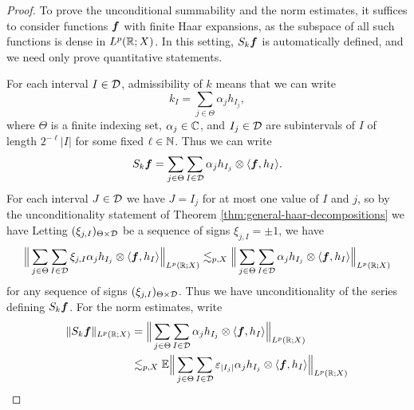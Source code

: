 \begin{proof}
  To prove the unconditional summability and the norm estimates, it suffices to consider functions $\bm{f}$ with finite Haar expansions, as the subspace of all such functions is dense in $L^p(\mathbb{R};X)$.
  In this setting, $S_{k}\bm{f}$ is automatically defined, and we need only prove quantitative statements.
  
  For each interval $I \in \mathcal{D}$, admissibility of $k$ means that we can write
  \begin{equation*}
    k_{I} = \sum_{j \in \Theta} \alpha_{j} h_{I_{j}},
  \end{equation*}
  where $\Theta$ is a finite indexing set, $\alpha_{j} \in \mathbb{C}$, and $I_{j} \in \mathcal{D}$ are subintervals of $I$ of length $2^{-\ell}|I|$ for some fixed $\ell \in \mathbb{N}$.
  Thus we can write
  \begin{equation*}
    \begin{aligned}
      S_{k}\bm{f} = \sum_{j \in \Theta} \sum_{I \in \mathcal{D}} \alpha_{j} h_{I_{j}} \otimes \langle \bm{f}, h_{I} \rangle .
    \end{aligned}
  \end{equation*}
  For each interval $J \in \mathcal{D}$ we have $J = I_{j}$ for at most one value of $I$ and $j$, so by the unconditionality statement of Theorem \ref{thm:general-haar-decompositions} we have
  Letting $(\xi_{j,I})_{\Theta \times \mathcal{D}}$ be a sequence of signs $\xi_{j,I} = \pm 1$, we have
  \begin{equation*}
      \Big\| \sum_{j \in \Theta} \sum_{I \in \mathcal{D}} \xi_{j,I} \alpha_{j} h_{I_{j}} \otimes \langle \bm{f}, h_{I} \rangle \Big\|_{L^p(\mathbb{R};X)}
      \lesssim_{p,X}  \Big\| \sum_{j \in \Theta} \sum_{I \in \mathcal{D}} \alpha_{j} h_{I_{j}} \otimes \langle \bm{f}, h_{I} \rangle \Big\|_{L^p(\mathbb{R};X)}
  \end{equation*}
  for any sequence of signs $(\xi_{j,I})_{\Theta \times \mathcal{D}}$.
  Thus we have unconditionality of the series defining $S_{k}\bm{f}$.
  For the norm estimates, write
  \begin{equation*}
    \begin{aligned}
      \|S_{k} \mb{f}\|_{L^p(\R;X)}
      &= \Big\| \sum_{j \in \Theta} \sum_{I \in \mc{D}} \alpha_{j} h_{I_{j}} \otimes \langle \mb{f}, h_{I} \rangle \Big\|_{L^p(\R;X)} \\
      &\lesssim_{p,X} \E \Big\| \sum_{j \in \Theta} \sum_{I \in \mc{D}} \varepsilon_{|I_{j}|} \alpha_{j} h_{I_{j}} \otimes \langle \mb{f}, h_{I} \rangle \Big\|_{L^p(\R;X)} \\

\end{aligned}
\end{equation*}
\end{proof}
